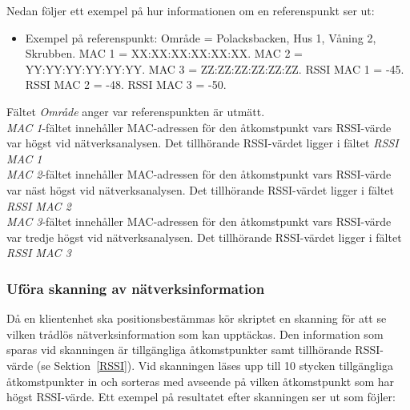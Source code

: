 \documentclass[a4paper,12pt]{article}
\begin{document}
 Nedan följer ett exempel på hur informationen om en referenspunkt ser ut:
 \begin{itemize}
   \item Exempel på referenspunkt:
         \newline Område = Polacksbacken, Hus 1, Våning 2, Skrubben.
         \newline MAC 1 = XX:XX:XX:XX:XX:XX.
         \newline MAC 2 = YY:YY:YY:YY:YY:YY.
         \newline MAC 3 = ZZ:ZZ:ZZ:ZZ:ZZ:ZZ.
         \newline RSSI MAC 1 = -45.
         \newline RSSI MAC 2 = -48.
         \newline RSSI MAC 3 = -50.
 \end{itemize}


 Fältet \textit{Område} anger var referenspunkten är utmätt. \\
 \textit{MAC 1}-fältet innehåller MAC-adressen för den åtkomstpunkt vars RSSI-värde var högst vid nätverksanalysen. Det tillhörande RSSI-värdet ligger i fältet \textit{RSSI MAC 1}\\
  \textit{MAC 2}-fältet innehåller MAC-adressen för den åtkomstpunkt vars RSSI-värde var näst högst vid nätverksanalysen. Det tillhörande RSSI-värdet ligger i fältet \textit{RSSI MAC 2}\\
   \textit{MAC 3}-fältet innehåller MAC-adressen för den åtkomstpunkt vars RSSI-värde var tredje högst vid nätverksanalysen. Det tillhörande RSSI-värdet ligger i fältet \textit{RSSI MAC 3}\\


 \subsubsection{Uföra skanning av nätverksinformation} \label{skanning}
 Då en klientenhet ska positionsbestämmas kör skriptet en skanning för att se vilken trådlös nätverksinformation som kan upptäckas. Den information som sparas vid skanningen är tillgängliga åtkomstpunkter samt tillhörande RSSI-värde (se Sektion~\ref{RSSI}). Vid skanningen läses upp till 10 stycken tillgängliga åtkomstpunkter in och sorteras med avseende på vilken åtkomstpunkt som har högst RSSI-värde. Ett exempel på resultatet efter skanningen ser ut som föjler:
\end{document}
